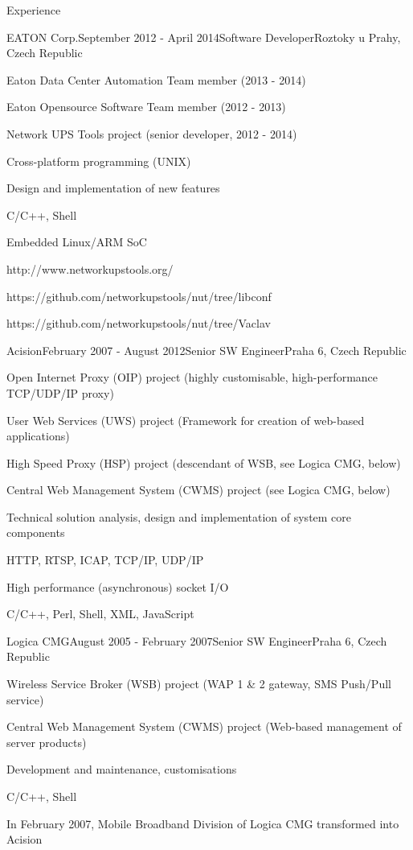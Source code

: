 \documentclass{resume} %
\begin{document}
\begin{rSection}{Experience}

\begin{rSubsection}{EATON Corp.}{September 2012 - April 2014}{Software Developer}{Roztoky u Prahy, Czech Republic}
\item Eaton Data Center Automation Team member (2013 - 2014)
\item Eaton Opensource Software Team member (2012 - 2013)
\item Network UPS Tools project (senior developer, 2012 - 2014)
\item Cross-platform programming (UNIX)
\item Design and implementation of new features
\item C/C++, Shell
\item Embedded Linux/ARM SoC
\item http://www.networkupstools.org/
\item https://github.com/networkupstools/nut/tree/libconf
\item https://github.com/networkupstools/nut/tree/Vaclav
\end{rSubsection}


\begin{rSubsection}{Acision}{February 2007 - August 2012}{Senior SW Engineer}{Praha 6, Czech Republic}
\item Open Internet Proxy (OIP) project (highly customisable, high-performance TCP/UDP/IP proxy)
\item User Web Services (UWS) project (Framework for creation of web-based applications)
\item High Speed Proxy (HSP) project (descendant of WSB, see Logica CMG, below)
\item Central Web Management System (CWMS) project (see Logica CMG, below)
\item Technical solution analysis, design and implementation of system core components
\item HTTP, RTSP, ICAP, TCP/IP, UDP/IP
\item High performance (asynchronous) socket I/O
\item C/C++, Perl, Shell, XML, JavaScript
\end{rSubsection}


\begin{rSubsection}{Logica CMG}{August 2005 - February 2007}{Senior SW Engineer}{Praha 6, Czech Republic}
\item Wireless Service Broker (WSB) project (WAP 1 \& 2 gateway, SMS Push/Pull service)
\item Central Web Management System (CWMS) project (Web-based management of server products)
\item Development and maintenance, customisations
\item C/C++, Shell
\item In February 2007, Mobile Broadband Division of Logica CMG transformed into Acision
\end{rSubsection}


\end{rSection}
\end{document}
